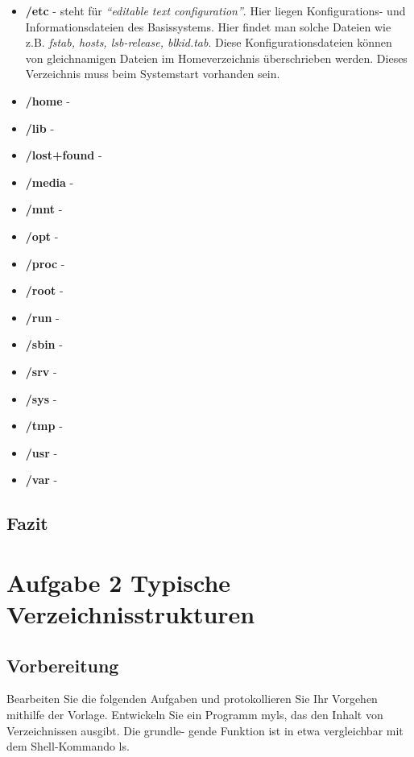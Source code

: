 \begin{itemize}
\begin{itemize}
			\item \textbf{/etc} - steht für \textit{``editable text configuration''}.
			Hier liegen Konfigurations- und Informationsdateien des Basissystems.
			Hier findet man solche Dateien wie z.B. \textit{fstab, hosts, lsb-release, blkid.tab}.
			Diese Konfigurationsdateien können von gleichnamigen Dateien im Homeverzeichnis überschrieben werden.
			Dieses Verzeichnis muss beim Systemstart vorhanden sein.
			\item \textbf{/home} -
			\item \textbf{/lib} -
			\item \textbf{/lost+found} -
			\item \textbf{/media} -
			\item \textbf{/mnt} -
			\item \textbf{/opt} -
			\item \textbf{/proc} -
			\item \textbf{/root} -
			\item \textbf{/run} -
			\item \textbf{/sbin }-
			\item \textbf{/srv }-
			\item \textbf{/sys} -
			\item \textbf{/tmp} -
			\item \textbf{/usr} -
			\item \textbf{/var }-

		\end{itemize}



	\end{itemize}

	\subsection{Fazit}

\newpage
\section{Aufgabe 2 Typische Verzeichnisstrukturen}
\subsection{Vorbereitung}
Bearbeiten Sie die folgenden Aufgaben und protokollieren Sie Ihr Vorgehen mithilfe der Vorlage.
Entwickeln Sie ein Programm myls, das den Inhalt von Verzeichnissen ausgibt. Die grundle-
gende Funktion ist in etwa vergleichbar mit dem Shell-Kommando ls.

